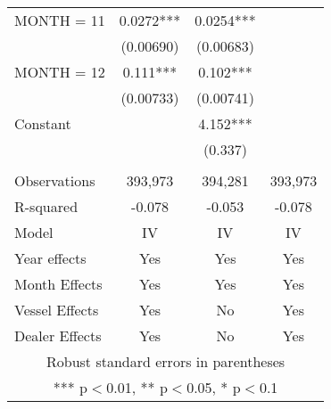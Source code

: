 \begin{tabular}{lccc}
MONTH = 11 & 0.0272*** & 0.0254*** &  \\
 & (0.00690) & (0.00683) &  \\
MONTH = 12 & 0.111*** & 0.102*** &  \\
 & (0.00733) & (0.00741) &  \\
Constant &  & 4.152*** &  \\
 &  & (0.337) &  \\
 &  &  &  \\
Observations & 393,973 & 394,281 & 393,973 \\
R-squared & -0.078 & -0.053 & -0.078 \\
Model & IV & IV & IV \\
Year effects & Yes & Yes & Yes \\
Month Effects & Yes & Yes & Yes \\
Vessel Effects & Yes & No & Yes \\
 Dealer Effects & Yes & No & Yes \\ \hline
\multicolumn{4}{c}{ Robust standard errors in parentheses} \\
\multicolumn{4}{c}{ *** p$<$0.01, ** p$<$0.05, * p$<$0.1} \\
\end{tabular}
